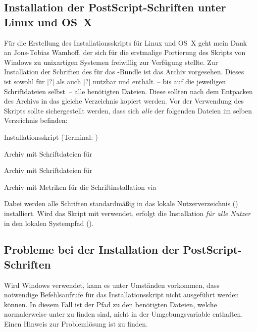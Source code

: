 \subsection{Installation der PostScript-Schriften unter Linux und OS~X}
%
%
Für die Erstellung des Installationsskripts für Linux und OS~X geht mein Dank 
an Jons-Tobias Wamhoff, der sich für die erstmalige Portierung des Skripts 
von Windows zu unixartigen Systemen freiwillig zur Verfügung stellte.
Zur Installation der Schriften des \CDs für das \TUDScript-Bundle ist das Archiv
 vorgesehen. Dieses ist sowohl für |?| als auch 
|?| nutzbar und enthält~-- bis auf die jeweiligen 
Schriftdateien selbst~-- alle benötigten Dateien. Diese sollten nach dem 
Entpacken des Archivs in das gleiche Verzeichnis kopiert werden. Vor der 
Verwendung des Skripts  sollte sichergestellt 
werden, dass sich \emph{alle} der folgenden Dateien im selben Verzeichnis 
befinden:
%
\settowidth{}%
\begin{description}[labelwidth=\tempdim,labelsep=1em]
  \item[\File{tudscrfonts\_install.sh}]Installationsskript
    (Terminal: )
  \item[\File{Univers\_PS.zip}]Archiv mit Schriftdateien für \Univers
  \item[\File{DIN\_Bd\_PS.zip}]Archiv mit Schriftdateien für \DIN
  \item[\File{tudscr\_fonts\_install.zip}]Archiv mit Metriken für die
    Schriftinstallation via 
\end{description}
%
Dabei werden alle Schriften standardmäßig in das lokale Nutzerverzeichnis 
() installiert. Wird das Skript mit  verwendet, 
erfolgt die Installation \emph{für alle Nutzer} in den lokalen Systempfad 
().



\subsection*{Probleme bei der Installation der PostScript-Schriften}
%
Wird Windows verwendet, kann es unter Umständen vorkommen, dass notwendige 
Befehlsaufrufe für das Installationsskript nicht ausgeführt werden können. In 
diesem Fall ist der Pfad zu den benötigten Dateien, welche normalerweise unter 
 zu finden sind, nicht in der 
Umgebungsvariable  enthalten. Einen Hinweis zur Problemlösung ist 
 zu finden.

